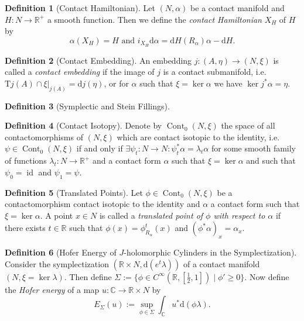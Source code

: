 \documentclass[a4paper]{article}
\newcommand{\RR}{\mathbb{R}}
\newcommand{\CC}{\mathbb{C}}
\newcommand{\dd}{\mathrm{d}}
\newcommand{\si}{\Sigma}
\newcommand{\cin}{C^{\infty}}
\newcommand{\lra}{\longrightarrow}
\newcommand{\id}{\operatorname{id}}
\newcommand{\ts}{\mathrm{T}}
\theoremstyle{definition}
\theoremstyle{definition}
\newtheorem{definition}{Definition}
\theoremstyle{remark}
\theoremstyle{remark}
\theoremstyle{remark}
\begin{document}
\begin{definition}[Contact Hamiltonian]
  Let $(N,\alpha)$ be a contact manifold and $H:N\lra\RR^+$ a smooth function. Then we define the \emph{contact Hamiltonian} $X_H$ of $H$ by
  \begin{equation*}
    \alpha(X_H)=H\text{ and }i_{X_H}\dd\alpha=\dd H(R_{\alpha})\alpha-\dd H.
  \end{equation*}
\end{definition}

\begin{definition}[Contact Embedding]
  An embedding $j:(A,\eta)\lra(N,\xi)$ is called a \emph{contact embedding} if the image of $j$ is a contact submanifold, i.e.\ $\ts j(A)\cap\xi|_{j(A)}=\dd j (\eta)$, or for $\alpha$ such that $\xi=\ker \alpha$ we have $\ker j^*\alpha=\eta$.
\end{definition}

\begin{definition}[Symplectic and Stein Fillings]
  
\end{definition}

\begin{definition}[Contact Isotopy]
  Denote by $\operatorname{Cont}_0(N,\xi)$ the space of all contactomorphisms of $(N,\xi)$ which are contact isotopic to the identity, i.e.\ $\psi\in\operatorname{Cont}_0(N,\xi)$ if and only if $\exists \psi_t:N\lra N:\psi_t^*\alpha=\lambda_t\alpha$ for some smooth family of functions $\lambda_t:N\lra\RR^+$ and a contact form $\alpha$ such that $\xi=\ker\alpha$ and such that $\psi_0=\id$ and $\psi_1=\psi$.
\end{definition}

\begin{definition}[Translated Points]
  Let $\phi\in\operatorname{Cont}_0(N,\xi)$ be a contactomorphism contact isotopic to the identity and $\alpha$ a contact form such that $\xi=\ker\alpha$. A point $x\in N$ is called a \emph{translated point of $\phi$ with respect to $\alpha$} if there exists $t\in\RR$ such that $\phi(x)=\phi_{R_{\alpha}}^t(x)$ and $(\phi^*\alpha)_x=\alpha_x$.
\end{definition}

\begin{definition}[Hofer Energy of $J$-holomorphic Cylinders in the Symplectization]
  Consider the symplectization $(\RR\times N,\dd (e^t\lambda))$ of a contact manifold $(N,\xi=\ker\lambda)$. Then define $\si:=\{\phi\in\cin(\RR,[\frac{1}{2},1])\mid\phi'\geq 0\}$. Now define the \emph{Hofer energy} of a map $u:\CC\lra \RR\times N$ by
  \begin{equation*}
    E_{\si}(u):=\sup_{\phi\in\si}\int_{\CC}u^*\dd(\phi\lambda).
  \end{equation*}
\end{definition}
\end{document}
